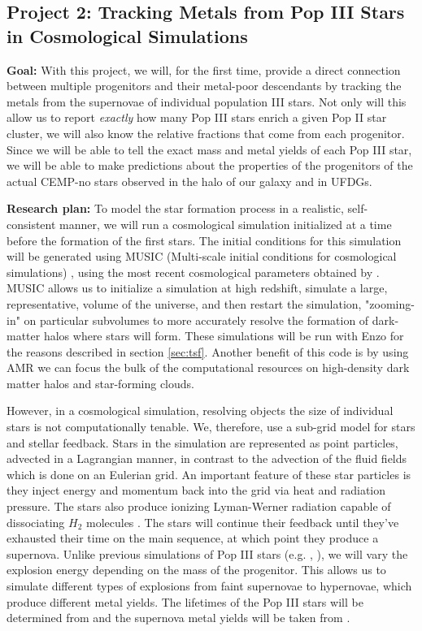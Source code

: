 \documentclass[letterpaper, 12pt]{article}
\begin{document}
\subsection*{Project 2: Tracking Metals from Pop III Stars in Cosmological Simulations}
\label{subsec:tracer_particles}

\textbf{Goal:} With this project, we will, for the first time, provide a direct connection between multiple progenitors and their metal-poor descendants by tracking the metals from the supernovae of individual population III stars. Not only will this allow us to report \textit{exactly} how many Pop III stars enrich a given Pop II star cluster, we will also know the relative fractions that come from each progenitor. Since we will be able to tell the exact mass and metal yields of each Pop III star, we will be able to make predictions about the properties of the progenitors of the actual CEMP-no stars observed in the halo of our galaxy and in UFDGs. 

\textbf{Research plan:} To model the star formation process in a realistic, self-consistent manner, we will run a cosmological simulation initialized at a time before the formation of the first stars. The initial conditions for this simulation will be generated using MUSIC (Multi-scale initial conditions for cosmological simulations) \citep{Hahn2011}, using the most recent cosmological parameters obtained by \cite{Planck2018}. MUSIC allows us to initialize a simulation at high redshift, simulate a large, representative, volume of the universe, and then restart the simulation, "zooming-in" on particular subvolumes to more accurately resolve the formation of dark-matter halos where stars will form. These simulations will be run with Enzo for the reasons described in section \ref{sec:tsf}. Another benefit of this code is by using AMR we can focus the bulk of the computational resources on high-density dark matter halos and star-forming clouds.

However, in a cosmological simulation, resolving objects the size of individual stars is not computationally tenable. We, therefore, use a sub-grid model for stars and stellar feedback. Stars in the simulation are represented as point particles, advected in a Lagrangian manner, in contrast to the advection of the fluid fields which is done on an Eulerian grid. An important feature of these star particles is they inject energy and momentum back into the grid via heat and radiation pressure. The stars also produce ionizing Lyman-Werner radiation capable of dissociating $H_2$ molecules \citep{Safranek-Shrader2012}. The stars will continue their feedback until they've exhausted their time on the main sequence, at which point they produce a supernova. Unlike previous simulations of Pop III stars (e.g. \cite{Smith2015}, \cite{Chiaki2019}), we will vary the explosion energy depending on the mass of the progenitor. This allows us to simulate different types of explosions from faint supernovae to hypernovae, which produce different metal yields. The lifetimes of the Pop III stars will be determined from \cite{Schaerer2002} and the supernova metal yields will be taken from \cite{Nomoto2006}.
 
\end{document}
